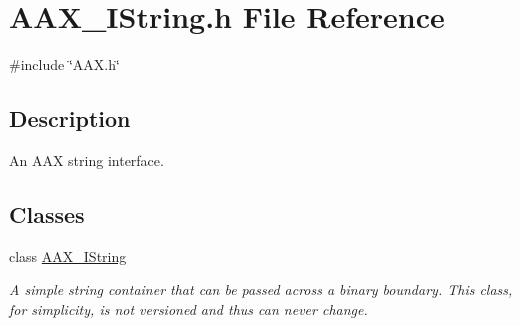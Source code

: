 \hypertarget{a00635}{}\section{A\+A\+X\+\_\+\+I\+String.\+h File Reference}
\label{a00635}
{\ttfamily \#include \char`\"{}A\+A\+X.\+h\char`\"{}}\newline


\subsection{Description}
An A\+AX string interface. 

\subsection*{Classes}
\begin{DoxyCompactItemize}
\item 
class \mbox{\hyperlink{a01873}{A\+A\+X\+\_\+\+I\+String}}
\begin{DoxyCompactList}\small\item\em A simple string container that can be passed across a binary boundary. This class, for simplicity, is not versioned and thus can never change. \end{DoxyCompactList}\end{DoxyCompactItemize}
